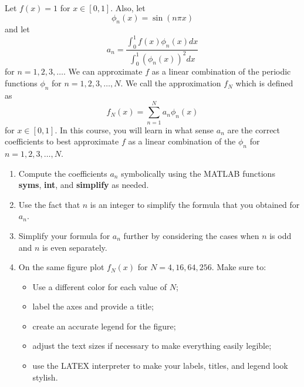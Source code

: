
Let $f(x)=1$ for $x\in[0,1]$. Also, let
\[
\phi_n(x)=\sin(n\pi x)
\]
and let
\[
a_n=\frac{\displaystyle{\int_0^1 f(x)\phi_n(x) dx}}{\displaystyle{\int_0^1 (\phi_n(x))^2 dx}}
\]
for $n=1,2,3,\ldots$. We can approximate $f$ as a linear combination of the periodic functions $\phi_n$ for $n=1,2,3,\ldots,N$.  We call the approximation $f_N$ which is defined as
\[
f_N(x)=\sum_{n=1}^N a_n \phi_n(x)
\]
 for $x\in[0,1]$. In this course, you will learn in what sense $a_n$ are the correct coefficients to best approximate $f$ as a linear combination of the $\phi_n$ for $n=1,2,3,\ldots,N$.
\\
\begin{enumerate}
\item Compute the coefficients $a_n$ symbolically using the MATLAB functions {\bf syms}, {\bf int}, and {\bf simplify} as needed.
\\
\item Use the fact that $n$ is an integer to simplify the formula that you obtained for $a_n$.
\\
\item Simplify your formula for $a_n$ further by considering the cases when $n$ is odd and $n$ is even separately.
\\
\item On the same figure plot $f_N(x)$ for $N=4,16,64,256$. Make sure to:
\begin{itemize}
\item Use a different color for each value of $N$;
\item label the axes and provide a title;
\item create an accurate legend for the figure;
\item adjust the text sizes if necessary to make everything easily legible;
\item use the LATEX interpreter to make your labels, titles, and legend look stylish.
\end{itemize}
\end{enumerate}



